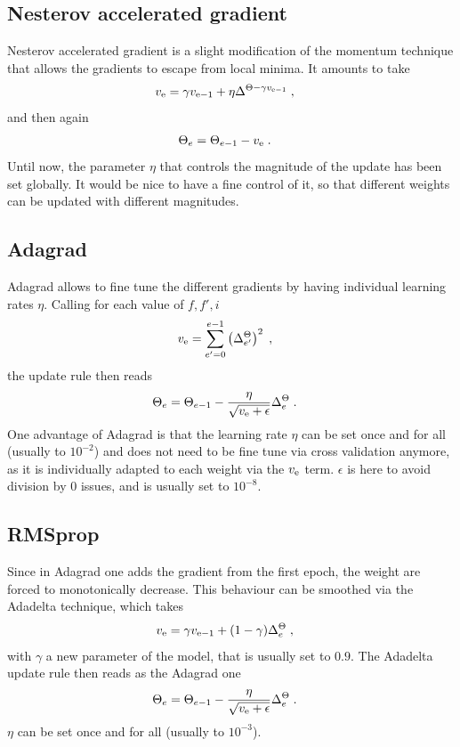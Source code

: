 \subsection{Nesterov accelerated gradient}

Nesterov accelerated gradient\cite{nesterov1983method} is a slight modification of the momentum technique that allows the gradients to escape from local minima. It amounts to take
\begin{align}
v_{{\rm e}}&=\gamma v_{{\rm e-1}}+\eta \Delta^{\Theta-\gamma v_{{\rm e-1}}}\;,
\end{align}
and then  again
\begin{align}
\Theta_e&=\Theta_{e-1}-v_{{\rm e}}\;.
\end{align}
Until now, the parameter $\eta$ that controls the magnitude of the update has been set globally. It would be nice to have a fine control of it, so that different weights can be updated with different magnitudes.

\subsection{Adagrad}

Adagrad\cite{Duchi:2011:ASM:1953048.2021068} allows to fine tune the different gradients by having individual learning rates $\eta$. Calling for each value of $f,f',i$
\begin{align}
v_{{\rm e}}&=\sum_{e'=0}^{e-1} \left(\Delta^{\Theta}_{e'}\right)^2\;,
\end{align}
the update rule then reads
\begin{align}
\Theta_e&=\Theta_{e-1}-\frac{\eta}{\sqrt{v_{{\rm e}}+\epsilon}}\Delta^{\Theta}_{e}\;.
\end{align}
One advantage of Adagrad is that the learning rate $\eta$ can be set once and for all (usually to $10^{-2}$) and does not need to be fine tune via cross validation anymore, as it is individually adapted to each weight via the $v_{{\rm e}}$ term. $\epsilon$ is here to avoid division by 0 issues, and is usually set to $10^{-8}$.

\subsection{RMSprop}

Since in Adagrad one adds the gradient from the first epoch, the weight are forced to monotonically decrease. This behaviour can be smoothed via the Adadelta technique, which takes
\begin{align}
v_{{\rm e}}&=\gamma v_{{\rm e-1}}+(1-\gamma )\Delta^{\Theta}_{e}\;,
\end{align}
with $\gamma$ a new parameter of the model, that is usually set to $0.9$. The Adadelta update rule then reads as the Adagrad one
\begin{align}
\Theta_e&=\Theta_{e-1}-\frac{\eta}{\sqrt{v_{{\rm e}}+\epsilon}}\Delta^{\Theta}_{e}\;.
\end{align}
$\eta$ can be set once and for all (usually to $10^{-3}$).

